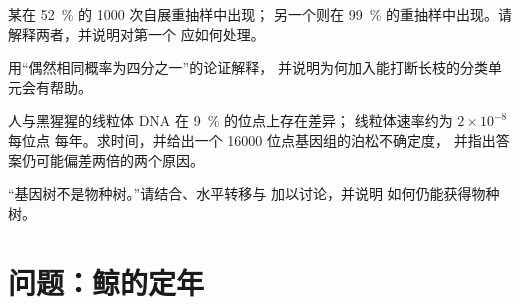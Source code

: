 \begin{exercise}[$\star\star$]\label{exo:b2:phylogenetic-trees:9}
某在 \qty{52}{\%} 的 \num{1000} 次自展重抽样中出现；
另一个则在 \qty{99}{\%} 的重抽样中出现。请解释两者，并说明对第一个
应如何处理。
\end{exercise}

\begin{exercise}[$\star\star\star$]\label{exo:b2:phylogenetic-trees:10}
用“偶然相同概率为四分之一”的论证解释，
并说明为何加入能打断长枝的分类单元会有帮助。
\end{exercise}

\begin{exercise}[$\star\star\star$]\label{exo:b2:phylogenetic-trees:11}
人与黑猩猩的线粒体 DNA 在 \qty{9}{\%} 的位点上存在差异；
线粒体速率约为 $2\times 10^{-8}$ 每位点
每年。求时间，并给出一个
\qty{16000}{} 位点基因组的泊松不确定度，
并指出答案仍可能偏差两倍的两个原因。
\end{exercise}

\begin{exercise}[$\star\star\star$]\label{exo:b2:phylogenetic-trees:12}
“基因树不是物种树。”请结合、水平转移与
加以讨论，并说明
如何仍能获得物种树。
\end{exercise}

\section{问题：鲸的定年}

